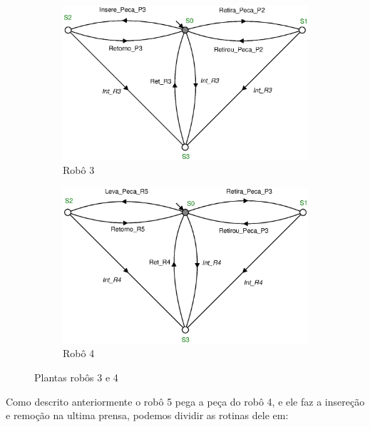 \begin{figure}[H]%
  \centering
  \begin{subfigure}[b]{0.45\textwidth}
      \centering
      \includegraphics[width=\textwidth]{imagens/Robo_3.eps}
      \caption{Robô 3}
      \label{fig:robo3}
  \end{subfigure}
  \hfill
  \begin{subfigure}[b]{0.45\textwidth}
      \centering
      \includegraphics[width=\textwidth]{imagens/Robo_4.eps}
      \caption{Robô 4}
      \label{fig:robo4}
  \end{subfigure}
  \caption{Plantas robôs 3 e 4}
  \label{fig:robo34}
\end{figure}

Como descrito anteriormente o robô 5 pega a peça do robô 4, e ele faz a insereção e remoção na ultima prensa, podemos dividir as rotinas dele em:

